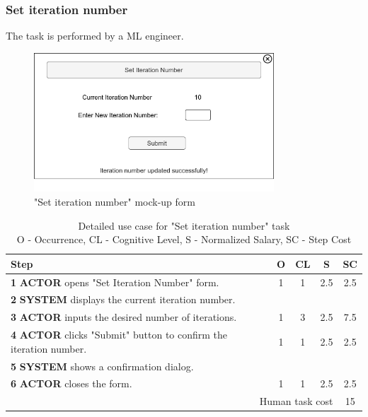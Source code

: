 \subsubsection{Set iteration number}

The task is performed by a ML engineer.

\begin{figure}[H]
\centering
\includegraphics[width=0.8\textwidth]{figures/set_iteration_number.png}
\caption{"Set iteration number" mock-up form}
\end{figure}

\begin{table}[H]
\centering
\begin{tabularx}{\textwidth}{|X|c|c|c|c|}
\hline
\textbf{Step} & \textbf{O} & \textbf{CL} & \textbf{S} & \textbf{SC} \\
\hline
\textbf{1} \textbf{ACTOR} opens "Set Iteration Number" form. & 1 & 1 & 2.5 & 2.5 \\
\hline
\textbf{2} \textbf{SYSTEM} displays the current iteration number. & & & & \\
\hline
\textbf{3} \textbf{ACTOR} inputs the desired number of iterations. & 1 & 3 & 2.5 & 7.5 \\
\hline
\textbf{4} \textbf{ACTOR} clicks "Submit" button to confirm the iteration number. & 1 & 1 & 2.5 & 2.5 \\
\hline
\textbf{5} \textbf{SYSTEM} shows a confirmation dialog. & & & & \\
\hline
\textbf{6} \textbf{ACTOR} closes the form. & 1 & 1 & 2.5 & 2.5 \\
\hline
\multicolumn{4}{|r|}{Human task cost} &  15 \\
\hline
\end{tabularx}
\caption{Detailed use case for "Set iteration number" task\\ 
O - Occurrence, CL - Cognitive Level, S - Normalized Salary, SC - Step Cost}
\label{table:set_iteration_number}
\end{table}

